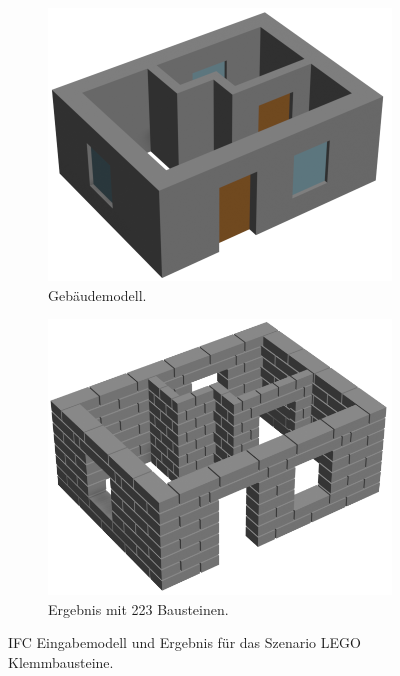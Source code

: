 \begin{figure}[htb]
  \begin{subfigure}[b]{0.49\columnwidth}
    \includegraphics[width=\columnwidth]{fig/scenario2_rendering_input.png}
    \caption{Gebäudemodell.}\label{fig:poc:scenario2 modell}
  \end{subfigure}
  \hfill
  \begin{subfigure}[b]{0.49\columnwidth}
    \includegraphics[width=\columnwidth]{fig/scenario2_render.png}
    \caption{Ergebnis mit 223 Bausteinen.}\label{fig:poc:scenario2_ergebnis}
  \end{subfigure}
\caption{IFC Eingabemodell und Ergebnis für das Szenario LEGO Klemmbausteine.}\label{fig:poc:result_scenario2}
\end{figure}

